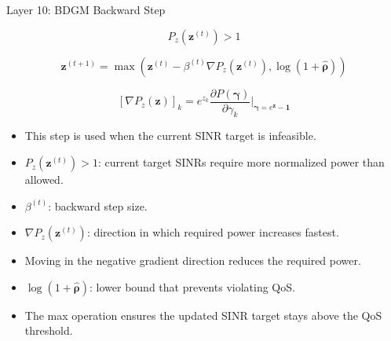 \documentclass{beamer}
\begin{document}
\begin{frame}{Layer 10: BDGM Backward Step}
\scriptsize

\[
P_z(\mathbf{z}^{(t)})>1
\]

\[
\mathbf{z}^{(t+1)}
=
\max
\left(
\mathbf{z}^{(t)}
-
\beta^{(t)}
\nabla P_z(\mathbf{z}^{(t)}),
\log(1+\widehat{\boldsymbol{\rho}})
\right)
\]

\[
[\nabla P_z(\mathbf{z})]_k
=
e^{z_k}
\frac{\partial P(\boldsymbol{\gamma})}{\partial \gamma_k}
\Bigg|_{\boldsymbol{\gamma}=e^{\mathbf{z}}-\mathbf{1}}
\]

\begin{itemize}
    \item This step is used when the current SINR target is infeasible.
    \item \(P_z(\mathbf{z}^{(t)})>1\): current target SINRs require more normalized power than allowed.
    \item \(\beta^{(t)}\): backward step size.
    \item \(\nabla P_z(\mathbf{z}^{(t)})\): direction in which required power increases fastest.
    \item Moving in the negative gradient direction reduces the required power.
    \item \(\log(1+\widehat{\boldsymbol{\rho}})\): lower bound that prevents violating QoS.
    \item The max operation ensures the updated SINR target stays above the QoS threshold.
\end{itemize}

\end{frame}
\end{document}
